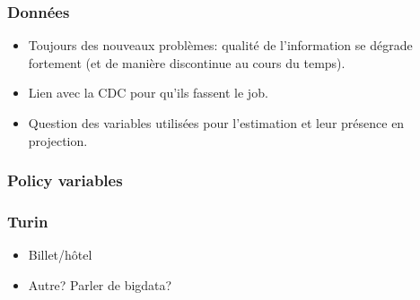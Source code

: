 \documentclass[11pt,a4paper]{article}
\begin{document}
\subsubsection*{Données}

\begin{itemize}
\item Toujours des nouveaux problèmes: qualité de l'information se dégrade fortement (et de manière discontinue au cours du temps). 
\item Lien avec la CDC pour qu'ils fassent le job. 
\item Question des variables utilisées pour l'estimation et leur présence en projection. 
\end{itemize}

\subsubsection*{Policy variables}


\subsubsection*{Turin}

\begin{itemize}
\item Billet/hôtel
\item Autre? Parler de bigdata?
\end{itemize}
\end{document}
